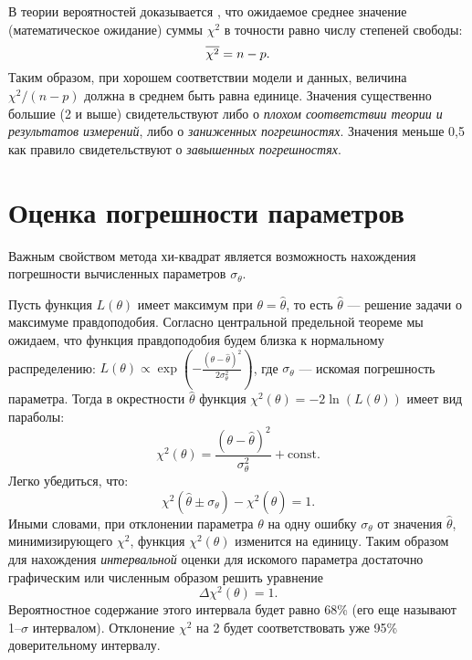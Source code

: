 В теории вероятностей доказывается \cite{hudson, idie},
что ожидаемое среднее значение (математическое ожидание) суммы $\chi^{2}$
в точности равно числу степеней свободы:
\[
\overline{\chi^{2}}=n-p.
\]
Таким образом, при хорошем соответствии модели и данных,
величина $\chi^2 / (n-p) $ должна в среднем быть равна единице.
Значения существенно большие (2 и выше) свидетельствуют либо о
\emph{плохом соответствии теории и результатов измерений},
    либо о \emph{заниженных погрешностях}.
    Значения меньше 0,5 как правило свидетельствуют о \emph{завышенных погрешностях}.


\section{Оценка погрешности параметров}

Важным свойством метода хи-квадрат является  возможность
нахождения погрешности вычисленных параметров $\sigma_{\theta}$.

Пусть функция $L(\theta)$ имеет максимум при $\theta = \hat{\theta}$, то есть 
$\hat{\theta}$ --- решение задачи о максимуме правдоподобия. Согласно центральной предельной теореме мы ожидаем, что функция правдоподобия будем близка к нормальному распределению: $L(\theta) \propto \exp\left(-\frac{(\theta - \hat{\theta})^2}{2 \sigma_\theta^2}\right) $, 
где $\sigma_\theta$ --- искомая погрешность параметра. Тогда в окрестности $\hat{\theta}$ функция $\chi^2(\theta) = -2 \ln(L(\theta))$ имеет вид параболы:
\[
\chi^2(\theta) = \frac{(\theta - \hat{\theta})^2}{\sigma_{\theta}^2} +\mathrm{const}.
\]
Легко убедиться, что:
\begin{equation*}
    \chi^2(\hat{\theta} \pm \sigma_\theta) - \chi^2(\hat{\theta}) = 1.
\end{equation*}
Иными словами, при отклонении параметра $\theta$ на одну ошибку $\sigma_{\theta}$ от значения
$\hat{\theta}$, 
минимизирующего $\chi^2$, функция $\chi^2(\theta)$ изменится на единицу. Таким образом для нахождения \emph{интервальной} оценки для искомого параметра достаточно графическим или численным образом решить уравнение
\begin{equation}
    \label{eq:deltachi2}
    \Delta \chi^2(\theta) = 1.
\end{equation}
Вероятностное содержание этого интервала будет равно 68\% (его еще называют 1--$\sigma$ интервалом). 
Отклонение $\chi^2$ на 2 будет соответствовать уже 95\% доверительному интервалу.

